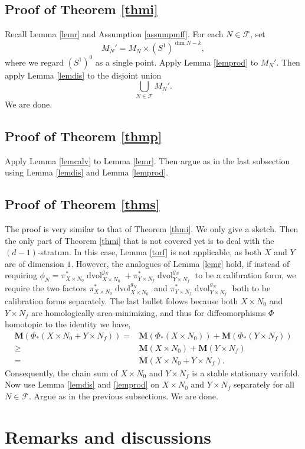 \documentclass[11pt,a4paper]{amsart}
\numberwithin{equation}{section}
\newcommand{\mff}{\mathcal{F}}
\newcommand{\ms}{\mathbf{M}}
\newcommand{\dvol}{\operatorname{dvol}}
\newcommand{\du}{^\ast}
\newcommand{\pf}{_\ast}
\newcommand{\pxn}{\pi_{X\times N_0}}
\newcommand{\pyn}{\pi_{Y\times N_f}}
\newcommand{\dvx}{\dvol_{X\times N_0}^{g_N}}
\newcommand{\dvy}{\dvol_{Y\times N_f}^{g_N}}
\theoremstyle{plain}
\theoremstyle{definition}
\numberwithin{equation}{subsection}
\begin{document}
\subsection{Proof of Theorem \ref{thmi}}\label{secpthmi}
Recall Lemma \ref{lemr} and Assumption \ref{assumpmff}. For each $N\in \mff$, set $$M_N'=M_N\times (S^1)^{\dim N-k},$$ where we regard $(S^1)^{0}$ as a single point. Apply Lemma \ref{lemprod} to $M_N'$. Then apply Lemma \ref{lemdis} to the disjoint union $$\bigcup_{N\in\mff}M_N'.$$ We are done.
\subsection{Proof of Theorem \ref{thmp}}
Apply Lemma \ref{lemcalv} to Lemma \ref{lemr}. Then argue as in the last subsection using Lemma \ref{lemdis} and Lemma \ref{lemprod}.
\subsection{Proof of Theorem \ref{thms}}
The proof is very similar to that of Theorem \ref{thmi}. We only give a sketch.  Then the only part of Theorem \ref{thmi} that is not covered yet is to deal with the $(d-1)$-stratum. In this case, Lemma \ref{torf} is not applicable, as both $X$ and $Y$ are of dimension $1$. However, the analogues of Lemma \ref{lemr} hold, if instead of requiring $\phi_N=\pxn\du\dvx+\pyn\du\dvy$ to be a calibration form, we require the two factors $\pxn\du\dvx$ and $\pyn\du\dvy$ both to be calibration forms separately.  The last bullet folows because both $X\times N_0$ and $Y\times N_f$ are homologically area-minimizing, and thus for diffeomorphisms $\Phi$ homotopic to the identity we have, \begin{align*}
	\ms(\Phi\pf(X\times N_0+Y\times N_f))=&\ms(\Phi\pf (X\times N_0))+\ms(\Phi\pf(Y\times N_f))\\\ge& \ms(X\times N_0)+\ms(Y\times N_f)\\=&\ms(X\times N_0+Y\times N_f).
\end{align*}  Consequently, the chain sum of $X\times N_0$ and $Y\times N_f$ is a stable stationary varifold. Now use Lemma \ref{lemdis} and \ref{lemprod} on $X\times N_0$ and $Y\times N_f$ separately for all $N\in\mathcal{F}$. Argue as in the previous subsections. We are done.
\section{Remarks and discussions}\label{conc}
\end{document}
